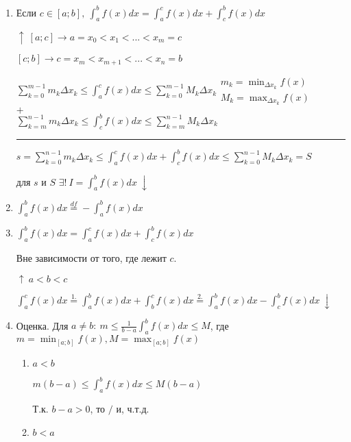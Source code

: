 \documentclass{article}
\begin{document}
\begin{enumerate}
    \item Если \(c \in [a;b],\ \int_a^b f(x)dx = \int_a^c f(x)dx + \int_c^b f(x)dx\)
    
    \(\uparrow\ [a;c] \rightarrow a = x_0 < x_1 < ... < x_m = c\)
    
    \([c;b] \rightarrow c = x_m < x_{m+1} < ... < x_n = b\)

    
    \( \sum_{k=0}^{m-1} m_k \Delta x_k \leq \int_{a}^{c}f(x)dx \leq \sum_{k=0}^{m-1}M_k \Delta x_k \begin{array}{l}m_k = \min_{\Delta x_k} f(x)\\ M_k = \max_{\Delta x_k} f(x)\end{array}\)\\
    \(+\)\\
    \( \sum_{k=m}^{n-1} m_k \Delta x_k \leq \int_{c}^{b}f(x)dx \leq \sum_{k=m}^{n-1}M_k \Delta x_k\)
    
    \rule{10cm}{0.5pt}

    \( s = \sum_{k = 0}^{n-1}m_k \Delta x_k \leq \int_{a}^{c}f(x)dx + \int_{c}^{b}f(x)dx \leq \sum_{k = 0}^{n - 1}M_k \Delta x_k = S\)

    для $s$ и $S$ \(\exists !\ I = \int_a^b f(x)dx\ \downarrow\)

    \item \(\int_a^b f(x)dx \overset{df} = -\int_a^b f(x)dx\)
    \item \(\int_a^b f(x)dx = \int_a^c f(x)dx + \int_c^b f(x)dx\)
    
    Вне зависимости от того, где лежит \(c\).

    \(\uparrow\ a < b < c\)

    \(\int_a^c f(x)dx \overset{1.}= \int_a^b f(x)dx + \int_b^c f(x)dx \overset{2.}= \int_a^b f(x)dx - \int_c^b f(x)dx\ \downarrow\)

    \item Оценка. Для \(a\neq b:\ m \leq \frac{1}{b-a}\int_a^b f(x)dx \leq M\), где \(m = \min_{[a;b]}f(x), M=\max_{[a;b]} f(x)\)
    
    \begin{enumerate}
        \item \(a < b\)
        
        \(m(b-a) \leq \int_a^b f(x)dx \leq M(b-a)\)

        Т.к. \(b-a > 0\), то \(/\) и, ч.т.д.

        \item \(b<a\)
        

\end{enumerate}
\end{enumerate}
\end{document}
